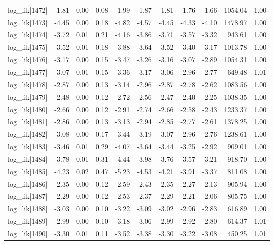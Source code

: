 \begin{table}[ht]
\begin{tabular}{rrrrrrrrrrr}
  log\_lik[1472] & -1.81 & 0.00 & 0.08 & -1.99 & -1.87 & -1.81 & -1.76 & -1.66 & 1054.04 & 1.00 \\ 
  log\_lik[1473] & -4.45 & 0.00 & 0.18 & -4.82 & -4.57 & -4.45 & -4.33 & -4.10 & 1478.97 & 1.00 \\ 
  log\_lik[1474] & -3.72 & 0.01 & 0.21 & -4.16 & -3.86 & -3.71 & -3.57 & -3.32 & 943.61 & 1.00 \\ 
  log\_lik[1475] & -3.52 & 0.01 & 0.18 & -3.88 & -3.64 & -3.52 & -3.40 & -3.17 & 1013.78 & 1.00 \\ 
  log\_lik[1476] & -3.17 & 0.00 & 0.15 & -3.47 & -3.26 & -3.16 & -3.07 & -2.89 & 1054.31 & 1.00 \\ 
  log\_lik[1477] & -3.07 & 0.01 & 0.15 & -3.36 & -3.17 & -3.06 & -2.96 & -2.77 & 649.48 & 1.01 \\ 
  log\_lik[1478] & -2.87 & 0.00 & 0.13 & -3.14 & -2.96 & -2.87 & -2.78 & -2.62 & 1083.56 & 1.00 \\ 
  log\_lik[1479] & -2.48 & 0.00 & 0.12 & -2.72 & -2.56 & -2.47 & -2.40 & -2.25 & 1038.35 & 1.00 \\ 
  log\_lik[1480] & -2.66 & 0.00 & 0.12 & -2.91 & -2.74 & -2.66 & -2.58 & -2.43 & 1233.37 & 1.00 \\ 
  log\_lik[1481] & -2.86 & 0.00 & 0.13 & -3.13 & -2.94 & -2.85 & -2.77 & -2.61 & 1378.25 & 1.00 \\ 
  log\_lik[1482] & -3.08 & 0.00 & 0.17 & -3.44 & -3.19 & -3.07 & -2.96 & -2.76 & 1238.61 & 1.00 \\ 
  log\_lik[1483] & -3.46 & 0.01 & 0.29 & -4.07 & -3.64 & -3.44 & -3.25 & -2.92 & 909.01 & 1.00 \\ 
  log\_lik[1484] & -3.78 & 0.01 & 0.31 & -4.44 & -3.98 & -3.76 & -3.57 & -3.21 & 918.70 & 1.00 \\ 
  log\_lik[1485] & -4.23 & 0.02 & 0.47 & -5.23 & -4.53 & -4.21 & -3.91 & -3.37 & 811.08 & 1.00 \\ 
  log\_lik[1486] & -2.35 & 0.00 & 0.12 & -2.59 & -2.43 & -2.35 & -2.27 & -2.13 & 905.94 & 1.00 \\ 
  log\_lik[1487] & -2.29 & 0.00 & 0.12 & -2.53 & -2.37 & -2.29 & -2.21 & -2.06 & 805.75 & 1.00 \\ 
  log\_lik[1488] & -3.03 & 0.00 & 0.10 & -3.22 & -3.09 & -3.02 & -2.96 & -2.83 & 616.89 & 1.00 \\ 
  log\_lik[1489] & -2.99 & 0.00 & 0.10 & -3.18 & -3.06 & -2.99 & -2.92 & -2.80 & 614.37 & 1.01 \\ 
  log\_lik[1490] & -3.30 & 0.01 & 0.11 & -3.52 & -3.38 & -3.30 & -3.22 & -3.08 & 450.25 & 1.01 \\ 

\end{tabular}
\end{table}
